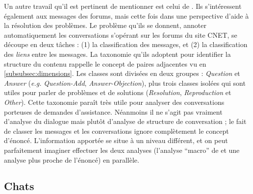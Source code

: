 \documentclass[10pt,a4paper,twoside]{article}
\newcommand{\quotes}[1]{``#1''}
\begin{document}
Un autre travail qu'il est pertinent de mentionner est celui de \citet{kim2010tagging}. Ils s'intéressent également aux messages des forums, mais cette fois dans une perspective d'aide à la résolution des problèmes. Le problème qu'ils se donnent, annoter automatiquement les conversations s'opérant sur les forums du site CNET, se découpe en deux tâches : (1) la classification des messages, et (2) la classification des \textit{liens} entre les messages. La taxonomie qu'ils adoptent pour identifier la structure du contenu rappelle le concept de paires adjacentes vu en \ref{subsubsec:dimensions}. Les classes sont divisées en deux groupes : \textit{Question} et \textit{Answer} (\textit{e.g.} \textit{Question-Add}, \textit{Answer-Objection}), plus trois classes isolées qui sont utiles pour parler de problèmes et de solutions (\textit{Resolution}, \textit{Reproduction} et \textit{Other}). Cette taxonomie paraît très utile pour analyser des conversations porteuses de demandes d'assistance. Néanmoins il ne s'agit pas vraiment d'analyse du dialogue mais plutôt d'analyse de structure de conversation ; le fait de classer les messages et les conversations ignore complètement le concept d'énoncé. L'information apportée se situe à un niveau différent, et on peut parfaitement imaginer effectuer les deux analyses (l'analyse \quotes{macro} de \citeauthor{kim2010tagging} et une analyse plus proche de l'énoncé) en parallèle.


\subsection{Chats}
\label{subsec:chats}
\end{document}
